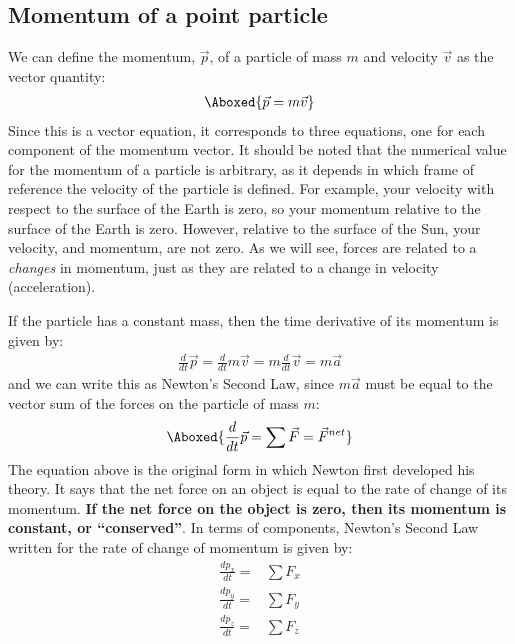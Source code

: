 \subsection{Momentum of a point particle}
We can define the momentum, $\vec p$, of a particle of mass $m$ and velocity $\vec v$ as the vector quantity:
\begin{align}
\Aboxed{\vec p = m\vec v}
\end{align}
Since this is a vector equation, it corresponds to three equations, one for each component of the momentum vector. It should be noted that the numerical value for the momentum of a particle is arbitrary, as it depends in which frame of reference the velocity of the particle is defined. For example, your velocity with respect to the surface of the Earth is zero, so your momentum relative to the surface of the Earth is zero. However, relative to the surface of the Sun, your velocity, and momentum, are not zero. As we will see, forces are related to a \textit{changes} in momentum, just as they are related to a change in velocity (acceleration). 

If the particle has a constant mass, then the time derivative of its momentum is given by:
\begin{align*}
\frac{d}{dt}\vec p = \frac{d}{dt}m\vec v = m\frac{d}{dt}\vec v=m\vec a
\end{align*}
and we can write this as Newton's Second Law, since $m\vec a$ must be equal to the vector sum of the forces on the particle of mass $m$:
\begin{align}
\Aboxed{\frac{d}{dt}\vec p = \sum \vec F = \vec F^{net}}
\end{align}
The equation above is the original form in which Newton first developed his theory. It says that the net force on an object is equal to the rate of change of its momentum. \textbf{If the net force on the object is zero, then its momentum is constant, or ``conserved''}. In terms of components, Newton's Second Law written for the rate of change of momentum is given by:
\begin{align*}
\frac{dp_x}{dt} =& \sum F_x\\
\frac{dp_y}{dt} =& \sum F_y\\
\frac{dp_z}{dt} =& \sum F_z
\end{align*}


